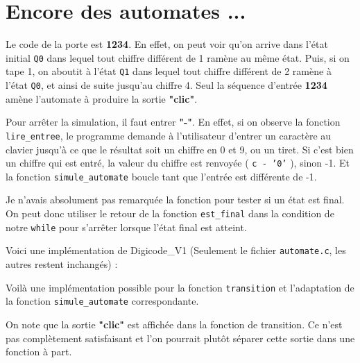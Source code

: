 \documentclass[10pt]{article}
\begin{document}
\vspace*{0.5cm}

\section{Encore des automates ...}

\begin{enumerate}[label=\textbf{[\alph*]}]
  \setlength\itemsep{1em}

\item Le code de la porte est \textbf{1234}. En effet, on peut voir
  qu'on arrive dans l'état initial \texttt{Q0} dans lequel tout
  chiffre différent de 1 ramène au même état. Puis, si on tape 1, on
  aboutit à l'état \texttt{Q1} dans lequel tout chiffre différent de 2
  ramène à l'état \texttt{Q0}, et ainsi de suite jusqu'au chiffre
  4. Seul la séquence d'entrée \textbf{1234} amène l'automate à
  produire la sortie \textbf{"clic"}.

\item Pour arrêter la simulation, il faut entrer \textbf{"-"}. En
  effet, si on observe la fonction \texttt{lire\_entree}, le programme
  demande à l'utilisateur d'entrer un caractère au clavier jusqu'à ce
  que le résultat soit un chiffre en 0 et 9, ou un tiret. Si c'est
  bien un chiffre qui est entré, la valeur du chiffre est renvoyée (
  \texttt{c - '0'} ), sinon -1. Et la fonction
  \texttt{simule\_automate} boucle tant que l'entrée est différente de
  -1.

\item Je n'avais absolument pas remarquée la fonction pour tester si
  un état est final. On peut donc utiliser le retour de la fonction
  \texttt{est\_final} dans la condition de notre \texttt{while} pour
  s'arrêter lorsque l'état final est atteint.

  \vspace{0.2cm}
  Voici une implémentation de Digicode\_V1 (Seulement le fichier
  \texttt{automate.c}, les autres restent inchangés) :

  

  \newpage
  Voilà une implémentation possible pour la fonction
  \texttt{transition} et l'adaptation de la fonction
  \texttt{simule\_automate} correspondante.

  \vspace{0.2cm}
  On note que la sortie \textbf{"clic"} est affichée dans la fonction
  de transition. Ce n'est pas complètement satisfaisant et l'on
  pourrait plutôt séparer cette sortie dans une fonction à part.


\end{enumerate}
\end{document}
